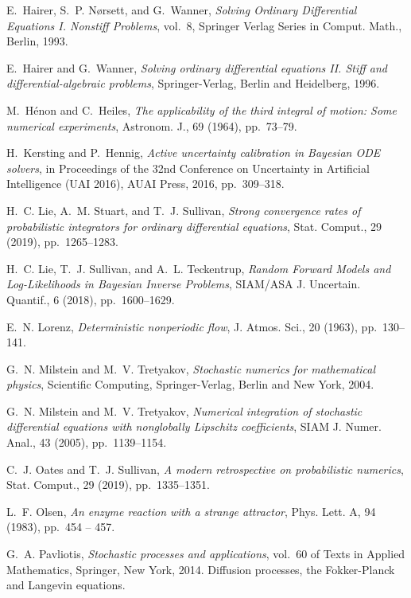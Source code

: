 \documentclass[10pt]{article}
\begin{document}
\begin{thebibliography}{10}
	{\sc E.~Hairer, S.~P. N{\o{}}rsett, and G.~Wanner}, {\em Solving Ordinary
		Differential Equations I. Nonstiff Problems}, vol.~8, Springer Verlag Series
	in Comput. Math., Berlin, 1993.
	
	{\sc E.~Hairer and G.~Wanner}, {\em Solving ordinary differential equations II.
		Stiff and differential-algebraic problems}, Springer-Verlag, Berlin and
	Heidelberg, 1996.
	
	{\sc M.~H\'enon and C.~Heiles}, {\em The applicability of the third integral of
		motion: {S}ome numerical experiments}, Astronom. J., 69 (1964), pp.~73--79.
	
	{\sc H.~Kersting and P.~Hennig}, {\em Active uncertainty calibration in
		{B}ayesian {ODE} solvers}, in Proceedings of the 32nd Conference on
	Uncertainty in Artificial Intelligence (UAI 2016), {AUAI} Press, 2016,
	pp.~309--318.
	
	{\sc H.~C. Lie, A.~M. Stuart, and T.~J. Sullivan}, {\em Strong convergence
		rates of probabilistic integrators for ordinary differential equations},
	Stat. Comput., 29 (2019), pp.~1265--1283.
	
	{\sc H.~C. Lie, T.~J. Sullivan, and A.~L. Teckentrup}, {\em Random {F}orward
		{M}odels and {L}og-{L}ikelihoods in {B}ayesian {I}nverse {P}roblems},
	SIAM/ASA J. Uncertain. Quantif., 6 (2018), pp.~1600--1629.
	
	{\sc E.~N. Lorenz}, {\em Deterministic nonperiodic flow}, J. Atmos. Sci., 20
	(1963), pp.~130--141.
	
	{\sc G.~N. Milstein and M.~V. Tretyakov}, {\em Stochastic numerics for
		mathematical physics}, Scientific Computing, Springer-Verlag, Berlin and New
	York, 2004.
	
	{\sc G.~N. Milstein and M.~V. Tretyakov}, {\em Numerical integration of
		stochastic differential equations with nonglobally {L}ipschitz coefficients},
	SIAM J. Numer. Anal., 43 (2005), pp.~1139--1154.
	
	{\sc C.~J. Oates and T.~J. Sullivan}, {\em A modern retrospective on
		probabilistic numerics}, Stat. Comput., 29 (2019), pp.~1335--1351.
	
	{\sc L.~F. Olsen}, {\em An enzyme reaction with a strange attractor}, Phys.
	Lett. A, 94 (1983), pp.~454 -- 457.
	
	{\sc G.~A. Pavliotis}, {\em Stochastic processes and applications}, vol.~60 of
	Texts in Applied Mathematics, Springer, New York, 2014.
	\newblock Diffusion processes, the Fokker-Planck and Langevin equations.
	

\end{thebibliography}
\end{document}
